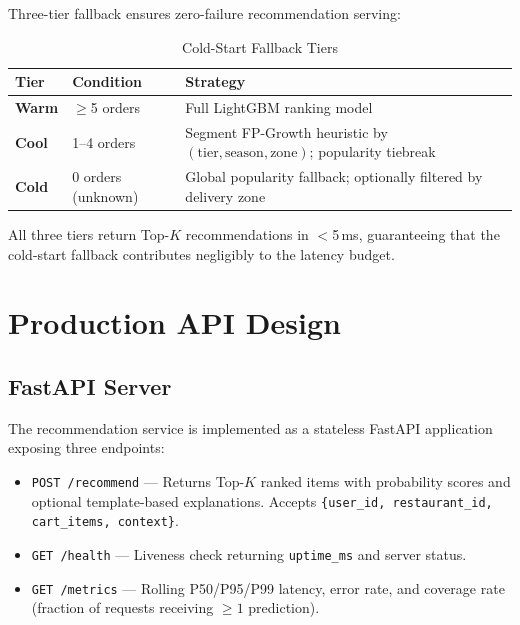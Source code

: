 \documentclass[conference]{IEEEtran}
\begin{document}
Three-tier fallback ensures zero-failure recommendation serving:

\begin{table}[h]
\caption{Cold-Start Fallback Tiers}
\centering
\begin{tabular}{llp{4cm}}
\toprule
Tier & Condition & Strategy \\
\midrule
\textbf{Warm} & $\geq$5 orders & Full LightGBM ranking model \\
\textbf{Cool} & 1--4 orders & Segment FP-Growth heuristic by
  $(\text{tier}, \text{season}, \text{zone})$; popularity tiebreak \\
\textbf{Cold} & 0 orders (unknown) & Global popularity fallback; 
  optionally filtered by delivery zone \\
\bottomrule
\end{tabular}
\end{table}

All three tiers return Top-$K$ recommendations in $<$5\,ms, guaranteeing
that the cold-start fallback contributes negligibly to the latency budget.


\section{Production API Design}

\subsection{FastAPI Server}

The recommendation service is implemented as a stateless FastAPI application
exposing three endpoints:

\begin{itemize}
  \item \texttt{POST /recommend} --- Returns Top-$K$ ranked items with
        probability scores and optional template-based explanations.
        Accepts \texttt{\{user\_id, restaurant\_id, cart\_items, context\}}.
  \item \texttt{GET /health} --- Liveness check returning \texttt{uptime\_ms}
        and server status.
  \item \texttt{GET /metrics} --- Rolling P50/P95/P99 latency, error rate,
        and coverage rate (fraction of requests receiving $\geq 1$ prediction).
\end{itemize}
\end{document}
